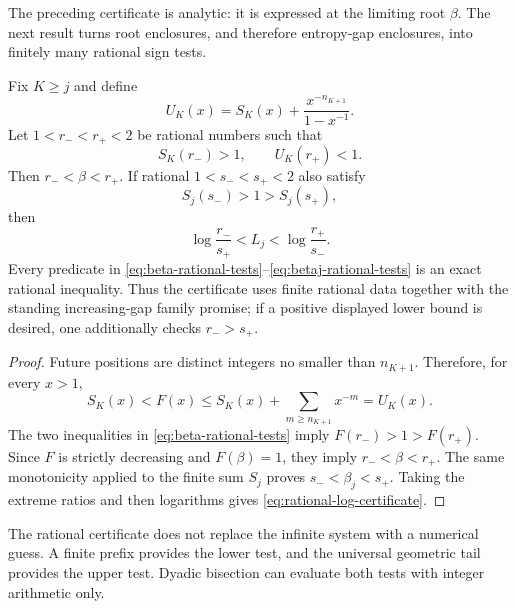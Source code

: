 The preceding certificate is analytic: it is expressed at the limiting root $\beta$.  The next result turns root enclosures, and therefore entropy-gap enclosures, into finitely many rational sign tests.

\begin{proposition}
\label{prop:rational-certificate}
Fix $K\geq j$ and define
\[
 U_K(x)=S_K(x)+\frac{x^{-n_{K+1}}}{1-x^{-1}}.
\]
Let $1<r_-<r_+<2$ be rational numbers such that
\begin{equation}
 S_K(r_-)>1,\qquad U_K(r_+)<1.
 \label{eq:beta-rational-tests}
\end{equation}
Then $r_-<\beta<r_+$.  If rational $1<s_-<s_+<2$ also satisfy
\begin{equation}
 S_j(s_-)>1>S_j(s_+),
 \label{eq:betaj-rational-tests}
\end{equation}
then
\begin{equation}
 \log\frac{r_-}{s_+}<L_j<\log\frac{r_+}{s_-}.
 \label{eq:rational-log-certificate}
\end{equation}
Every predicate in \eqref{eq:beta-rational-tests}--\eqref{eq:betaj-rational-tests} is an exact rational inequality.  Thus the certificate uses finite rational data together with the standing increasing-gap family promise; if a positive displayed lower bound is desired, one additionally checks $r_->s_+$.
\end{proposition}

\begin{proof}
Future positions are distinct integers no smaller than $n_{K+1}$.  Therefore, for every $x>1$,
\[
 S_K(x)<F(x)\leq S_K(x)+\sum_{m\geq n_{K+1}}x^{-m}=U_K(x).
\]
The two inequalities in \eqref{eq:beta-rational-tests} imply $F(r_-)>1>F(r_+)$.  Since $F$ is strictly decreasing and $F(\beta)=1$, they imply $r_-<\beta<r_+$.  The same monotonicity applied to the finite sum $S_j$ proves $s_-<\beta_j<s_+$.  Taking the extreme ratios and then logarithms gives \eqref{eq:rational-log-certificate}.
\end{proof}

\begin{remark}
The rational certificate does not replace the infinite system with a numerical guess.  A finite prefix provides the lower test, and the universal geometric tail provides the upper test.  Dyadic bisection can evaluate both tests with integer arithmetic only.
\end{remark}
